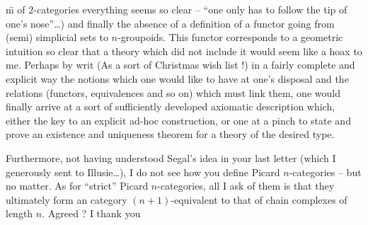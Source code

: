 \={m} of $2$-categories everything seems so clear -- ``one only has to follow the tip of one's nose''\dots) and finally the absence of a definition of a functor going from (semi) simplicial sets to $n$-groupoids. This functor corresponds to a geometric intuition so clear that a theory which did not include it would seem like a hoax to me. Perhaps by writ (As a sort of Christmas wish list !) in a fairly complete and explicit way the  notions which one would like to have at one's disposal and the relations (functors, equivalences and so on) which must link them, one would finally arrive at a sort of sufficiently developed axiomatic description which, either  the key to an explicit ad-hoc construction, or  one at a pinch to state and prove an existence and uniqueness theorem for a theory of the desired type.

Furthermore, not having understood Segal's idea in your last letter (which I generously sent to Illusie\dots), I do not see how you define Picard $n$-categories -- but no matter. As for ``strict'' Picard $n$-categories, all I ask of them is that they ultimately form an category $(n+1)$-equivalent to that of chain complexes of length\unsure{,} $n$. Agreed ? I thank you
